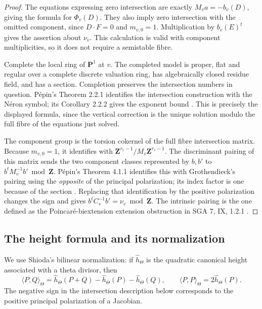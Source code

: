 \begin{proof}
The equations expressing zero intersection are exactly
$M_v a=-b_v(D)$, giving the formula for $\Phi_v(D)$.
They also imply zero intersection with the omitted component, since
$D\cdot F=0$ and $m_{v,0}=1$.  Multiplication by $b_v(E)^t$ gives the
assertion about $\nu_v$.  This calculation is valid with component
multiplicities, so it does not require a semistable fibre.

Complete the local ring of $\mathbf P^1$ at $v$.  The completed model
is proper, flat and regular over a complete discrete valuation ring,
has algebraically closed residue field, and has a section.  Completion
preserves the intersection numbers in question.  P\'epin's
Theorem 2.2.1 identifies the intersection construction with the N\'eron
symbol; its Corollary 2.2.2 gives the exponent bound
\cite[pp.~1323--1324]{Pepin2012}.  This is precisely the displayed
formula, since the vertical correction is the unique solution modulo
the full fibre of the equations just solved.

The component group is the torsion cokernel of the full fibre
intersection matrix.  Because $m_{v,0}=1$, it identifies with
$\mathbf Z^{r_v-1}/M_v\mathbf Z^{r_v-1}$.  The discriminant pairing of
this matrix sends the two component classes represented by $b,b'$ to
$b^tM_v^{-1}b'\bmod\mathbf Z$.  P\'epin's Theorem 4.1.1 identifies this
with Grothendieck's pairing using the \emph{opposite} of the principal
polarization; its index factor is one because of the section
\cite[pp.~1341--1343]{Pepin2012}.  Replacing that identification by the
positive polarization changes the sign and gives
$b^tC_v^{-1}b'=\nu_v\bmod\mathbf Z$.
The intrinsic pairing is the one defined as the Poincar\'e-biextension
extension obstruction in SGA 7, IX, 1.2.1 \cite{SGA7Pairing}.
\end{proof}

\subsection{The height formula and its normalization}

We use Shioda's bilinear normalization: if $\widehat h_\Theta$ is the
quadratic canonical height associated with a theta divisor, then
\[
 \langle P,Q\rangle_\Theta
  =\widehat h_\Theta(P+Q)-\widehat h_\Theta(P)-\widehat h_\Theta(Q),
 \qquad \langle P,P\rangle_\Theta=2\widehat h_\Theta(P).
\]
The negative sign in the intersection description below corresponds to
the positive principal polarization of a Jacobian.

